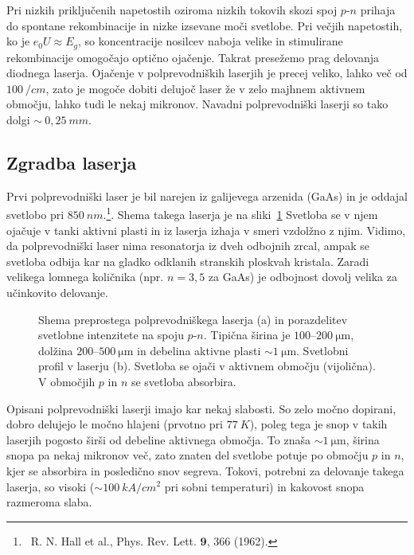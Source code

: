 Pri nizkih 
priključenih napetostih oziroma nizkih tokovih skozi spoj $p$-$n$ prihaja
do spontane rekombinacije in nizke izsevane moči svetlobe. 
Pri večjih napetostih, ko je $e_0U \approx E_g$, so koncentracije nosilcev naboja velike in
stimulirane rekombinacije omogočajo optično ojačenje. Takrat presežemo prag delovanja
diodnega laserja. 
Ojačenje v polprevodniških laserjih je precej veliko, lahko več od 
$100~/\si{cm}$, zato je mogoče dobiti delujoč laser že v zelo majhnem aktivnem 
območju, lahko tudi le nekaj mikronov. Navadni polprevodniški laserji so tako 
dolgi $\sim~0,25~\si{mm}$.
\newpage

\subsection*{Zgradba laserja}
Prvi polprevodniški laser je bil narejen iz galijevega arzenida (GaAs) in je oddajal svetlobo 
pri $850~\si{nm}$.\footnote{~R. N. Hall 
et al., Phys. Rev. Lett. $\mathbf{9}$, 366 (1962).}. 
Shema takega laserja je na sliki~\ref{fig:pnshema} Svetloba se v njem ojačuje
v tanki aktivni plasti in iz laserja izhaja v smeri vzdolžno z njim. 
Vidimo, da polprevodniški laser nima resonatorja iz dveh odbojnih zrcal,
ampak se svetloba odbija kar na gladko odklanih stranskih ploskvah kristala. Zaradi
velikega lomnega količnika (npr. $n=3,5$ za GaAs) je odbojnost dovolj velika
za učinkovito delovanje.
\begin{figure}[ht]
\centering
\def\svgwidth{120truemm} 

\caption{Shema preprostega polprevodniškega laserja (a) in porazdelitev svetlobne
intenzitete na spoju $p$-$n$. Tipična širina je $100$--$200~\si{\micro\metre}$, 
dolžina $200$--$500~\si{\micro\metre}$ in debelina aktivne plasti  $\sim 1~\si{\micro\metre}$. 
Svetlobni profil v laserju (b). Svetloba 
se ojači v aktivnem območju (vijolična). V območjih $p$ in $n$ se svetloba absorbira.
}
\label{fig:pnshema}
\end{figure}

Opisani polprevodniški laserji imajo kar nekaj slabosti. So zelo močno dopirani, 
dobro delujejo le močno hlajeni (prvotno pri $77~\si{K}$), poleg tega je snop 
v takih laserjih pogosto širši od debeline aktivnega območja. To znaša
$\sim 1~\si{\micro\meter}$, širina snopa pa nekaj mikronov več, zato
znaten del svetlobe potuje po območju $p$ in $n$, kjer se absorbira in posledično
snov segreva. Tokovi, potrebni za 
delovanje takega laserja, so visoki ($\sim 100~\si{kA}/\si{cm}^2$ pri sobni temperaturi) in
kakovost snopa razmeroma slaba. 

